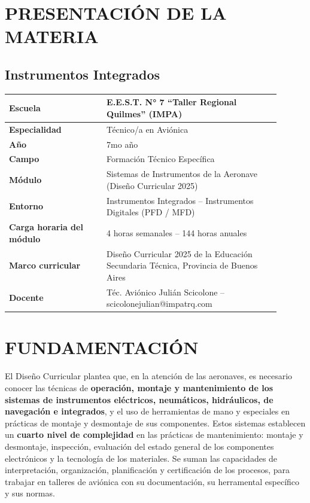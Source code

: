 \section*{PRESENTACIÓN DE LA MATERIA}
\subsection*{Instrumentos Integrados}

\begin{center}
\small
\begin{tabular}{|p{0.32\linewidth}|p{0.58\linewidth}|}
\hline
\textbf{Escuela} & E.E.S.T. N° 7 ``Taller Regional Quilmes'' (IMPA) \\ \hline
\textbf{Especialidad} & Técnico/a en Aviónica \\ \hline
\textbf{Año} & 7mo año \\ \hline
\textbf{Campo} & Formación Técnico Específica \\ \hline
\textbf{Módulo} & Sistemas de Instrumentos de la Aeronave (Diseño Curricular 2025) \\ \hline
\textbf{Entorno} & Instrumentos Integrados -- Instrumentos Digitales (PFD / MFD) \\ \hline
\textbf{Carga horaria del módulo} & 4 horas semanales -- 144 horas anuales \\ \hline
\textbf{Marco curricular} & Diseño Curricular 2025 de la Educación Secundaria Técnica, Provincia de
Buenos Aires \\ \hline
\textbf{Docente} & Téc. Aviónico Julián Scicolone -- scicolonejulian@impatrq.com \\ \hline
\end{tabular}
\end{center}

\section*{FUNDAMENTACIÓN}

El Diseño Curricular plantea que, en la atención de las aeronaves, es necesario conocer las
técnicas de \textbf{operación, montaje y mantenimiento de los sistemas de instrumentos
eléctricos, neumáticos, hidráulicos, de navegación e integrados}, y el uso de herramientas de mano
y especiales en prácticas de montaje y desmontaje de sus componentes. Estos sistemas establecen
un \textbf{cuarto nivel de complejidad} en las prácticas de mantenimiento: montaje y desmontaje,
inspección, evaluación del estado general de los componentes electrónicos y la tecnología de los
materiales. Se suman las capacidades de interpretación, organización, planificación y
certificación de los procesos, para trabajar en talleres de aviónica con su documentación, su
herramental específico y sus normas.

